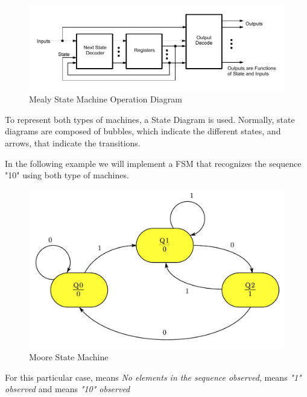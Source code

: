 \vspace{-0.3cm}

\begin{figure}[H]
    \centering
    \includegraphics[width = \textwidth]{Graphics/Practice 4/MEALY.pdf}
    \caption{Mealy State Machine Operation Diagram ~\autocite{AMD}}
    \label{fig:MEALY}
\end{figure}


To represent both types of machines, a State Diagram is used. Normally, state diagrams are composed of bubbles, which indicate the different states, and arrows, that indicate the transitions.\medskip

In the following example we will implement a FSM that recognizes the sequence "10" using both type of machines.

\begin{figure}[H]
    \centering
    \includegraphics[scale = 0.55]{Graphics/Practice 4/MOORE_FSM.pdf}
    \caption{Moore State Machine ~\autocite{SLIDES_4}}
    \label{fig:MOORE}
\end{figure}

For this particular case,  means \textit{No elements in the sequence observed},  means \textit{"1" observed} and  means \textit{"10" observed}

\vspace{-0.3cm}

